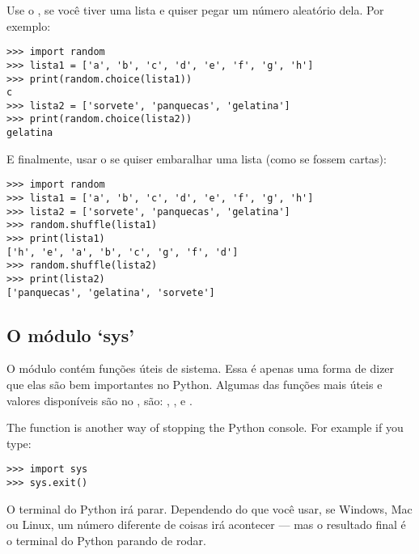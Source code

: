 Use o , se você tiver uma lista e quiser pegar um número aleatório dela. Por exemplo:

\begin{listingignore}
\begin{verbatim}
>>> import random
>>> lista1 = ['a', 'b', 'c', 'd', 'e', 'f', 'g', 'h']
>>> print(random.choice(lista1))
c
>>> lista2 = ['sorvete', 'panquecas', 'gelatina']
>>> print(random.choice(lista2))
gelatina
\end{verbatim}
\end{listingignore}

E finalmente, usar o  se quiser embaralhar uma lista (como se fossem cartas):

\begin{listingignore}
\begin{verbatim}
>>> import random
>>> lista1 = ['a', 'b', 'c', 'd', 'e', 'f', 'g', 'h']
>>> lista2 = ['sorvete', 'panquecas', 'gelatina']
>>> random.shuffle(lista1)
>>> print(lista1)
['h', 'e', 'a', 'b', 'c', 'g', 'f', 'd']
>>> random.shuffle(lista2)
>>> print(lista2)
['panquecas', 'gelatina', 'sorvete']
\end{verbatim}
\end{listingignore}

\subsection*{O módulo `sys'}

O módulo  contém funções úteis de sistema. Essa é apenas uma forma de dizer que elas são bem importantes no Python. Algumas das funções mais úteis e valores disponíveis são no , são: , ,  e .
\par
The  function is another way of stopping the Python console. For example if you type:

\begin{listingignore}
\begin{verbatim}
>>> import sys
>>> sys.exit()
\end{verbatim}
\end{listingignore}

O terminal do Python irá parar. Dependendo do que você usar, se Windows, Mac ou Linux, um número diferente de coisas irá acontecer --- mas o resultado final é o terminal do Python parando de rodar.

